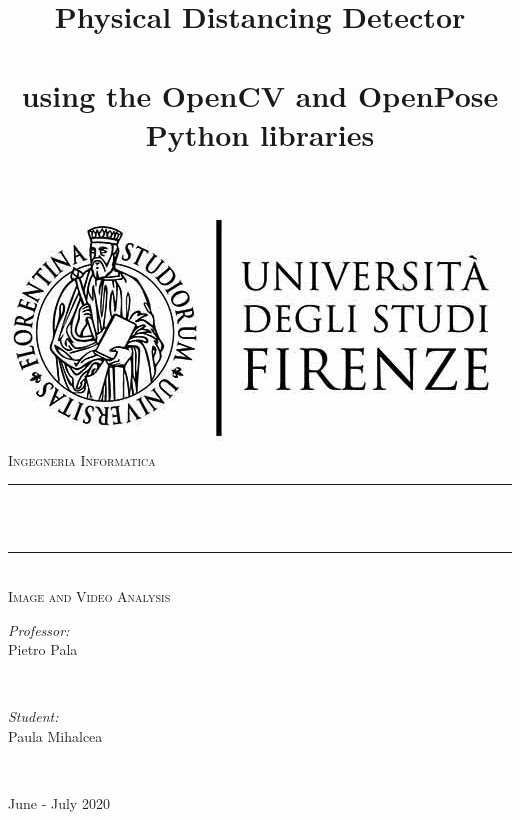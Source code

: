 \documentclass[12pt]{article}
\title{\LARGE Physical Distancing Detector
\\ \vspace{5mm}
\\ \large using the OpenCV and OpenPose Python libraries}
\makeatletter
\let\thetitle\@title
\makeatother
\begin{document}

\begin{titlepage}
	\centering
    \vspace*{0.5 cm}
    \includegraphics[scale = 0.85]{img/logo.jpg}\\[1.0 cm]

	\textsc{\LARGE Ingegneria Informatica}\\[2 cm]	
	\rule{\linewidth}{0.2 mm} \\[0.4 cm]
	{ \huge \bfseries \thetitle}\\
	\rule{\linewidth}{0.2 mm} \\[1 cm]

	\textsc{\large Image and Video Analysis}\\[1 cm]
	\begin{minipage}{0.4\textwidth}
		\begin{flushleft} \large
			\emph{Professor:}\\
			Pietro Pala\\
			\end{flushleft}
			\end{minipage}~
			\begin{minipage}{0.4\textwidth}
        
		\begin{flushright} \large
			\emph{Student:} \\
			Paula Mihalcea\\
		\end{flushright}
        
	\end{minipage}\\[2 cm]
	
	\vspace*{2.8 cm}
	\begin{center} \large
			June - July 2020
		\end{center}
	
\end{titlepage}
\end{document}
